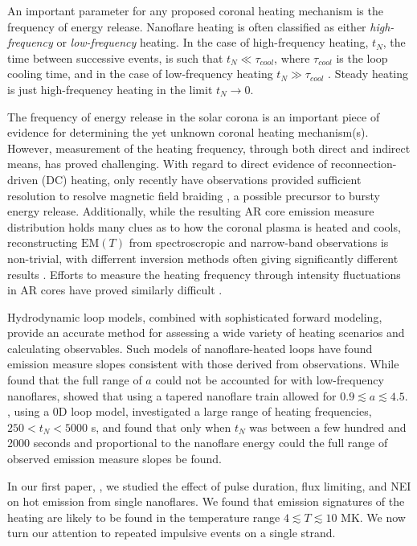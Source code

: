 \documentclass[apj]{emulateapj}
\begin{document}
	\par An important parameter for any proposed coronal heating mechanism is the frequency of energy release. Nanoflare heating is often classified as either \textit{high-frequency} or \textit{low-frequency} heating. In the case of high-frequency heating, $t_N$, the time between successive events, is such that $t_N\ll\tau_{cool}$, where $\tau_{cool}$ is the loop cooling time, and in the case of low-frequency heating $t_N\gg\tau_{cool}$ \citep{cargill_modelling_2015}. Steady heating is just high-frequency heating in the limit $t_N\to0$.
	\par The frequency of energy release in the solar corona is an important piece of evidence for determining the yet unknown coronal heating mechanism(s). However, measurement of the heating frequency, through both direct and indirect means, has proved challenging. With regard to direct evidence of reconnection-driven (DC) heating, only recently have observations provided sufficient resolution to resolve magnetic field braiding \citep{cirtain_energy_2013}, a possible precursor to bursty energy release. Additionally, while the resulting AR core emission measure distribution holds many clues as to how the coronal plasma is heated and cools, reconstructing $\mathrm{EM}(T)$ from spectroscropic and narrow-band observations is non-trivial, with differrent inversion methods often giving significantly different results \citep{landi_monte_2012,aschwanden_benchmark_2015}. Efforts to measure the heating frequency through intensity fluctuations in AR cores have proved similarly difficult \citep{ugarte-urra_determining_2014}.
	\par Hydrodynamic loop models, combined with sophisticated forward modeling, provide an accurate method for assessing a wide variety of heating scenarios and calculating observables. Such models of nanoflare-heated loops have found emission measure slopes consistent with those derived from observations. While \citet{bradshaw_diagnosing_2012} found that the full range of $a$ could not be accounted for with low-frequency nanoflares, \citet{reep_diagnosing_2013} showed that using a tapered nanoflare train allowed for $0.9\lesssim a\lesssim4.5$. \citet{cargill_active_2014}, using a 0D loop model, investigated a large range of heating frequencies, $250<t_N<5000$ s, and found that only when $t_N$ was between a few hundred and 2000 seconds and proportional to the nanoflare energy could the full range of observed emission measure slopes be found. 
	\par In our first paper, \citet{barnes_inference_2016} , we studied the effect of pulse duration, flux limiting, and NEI on hot emission from single nanoflares. We found that emission signatures of the heating are likely to be found in the temperature range $4\lesssim T\lesssim 10$ MK. We now turn our attention to repeated impulsive events on a single strand.
\end{document}
